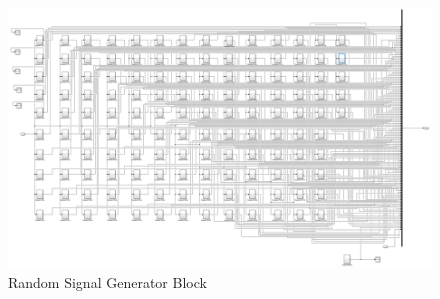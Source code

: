 \begin{figure}[ht]
\centering
\includegraphics[width=12cm]{figures/random_signal_simulink.png}
\caption{Random Signal Generator Block}
\label{fig:random_signal_simulink}
\end{figure}

